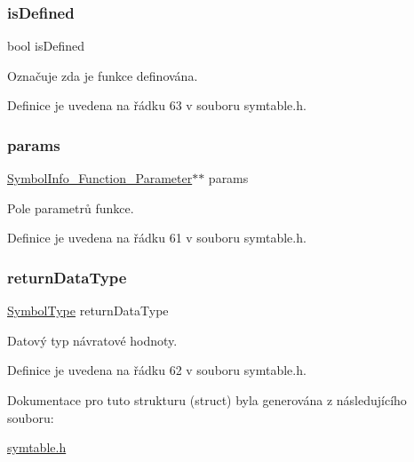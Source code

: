 \subsubsection{\texorpdfstring{is\+Defined}{isDefined}}
{\footnotesize\ttfamily bool is\+Defined}



Označuje zda je funkce definována. 



Definice je uvedena na řádku 63 v souboru symtable.\+h.

\mbox{\label{struct_s___symbol_info___function_a523efb68a2dc227e238af5fc1e1e38e0}} 
\subsubsection{\texorpdfstring{params}{params}}
{\footnotesize\ttfamily \hyperlink{symtable_8h_a6f66814120a40ef33089435deec15f47}{Symbol\+Info\+\_\+\+Function\+\_\+\+Parameter}$\ast$$\ast$ params}



Pole parametrů funkce. 



Definice je uvedena na řádku 61 v souboru symtable.\+h.

\mbox{\label{struct_s___symbol_info___function_a4ce26a8194ccedd60da46576f0fb9453}} 
\subsubsection{\texorpdfstring{return\+Data\+Type}{returnDataType}}
{\footnotesize\ttfamily \hyperlink{symtable_8h_a623952f6aa67a355a3840e25272b1c91}{Symbol\+Type} return\+Data\+Type}



Datový typ návratové hodnoty. 



Definice je uvedena na řádku 62 v souboru symtable.\+h.



Dokumentace pro tuto strukturu (struct) byla generována z následujícího souboru\+:\begin{DoxyCompactItemize}
\item 
\hyperlink{symtable_8h}{symtable.\+h}\end{DoxyCompactItemize}
